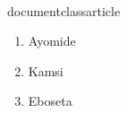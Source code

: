 \\documentclass{article}
\begin{document}
	
	\begin{enumerate}
		\item Ayomide
		\item Kamsi
		\item Eboseta
	\end{enumerate}
	
\end{document}

